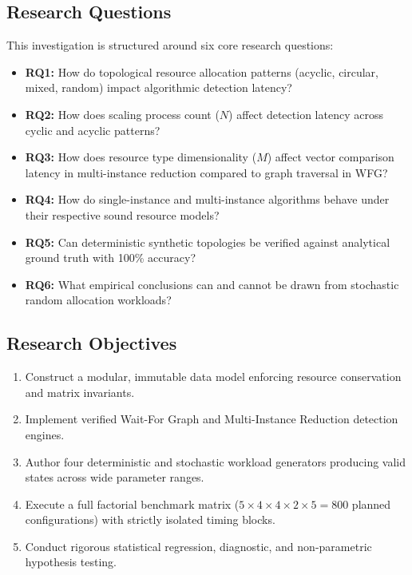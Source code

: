 \documentclass[11pt,a4paper]{article}
\begin{document}
\subsection{Research Questions}
This investigation is structured around six core research questions:
\begin{itemize}
    \item \textbf{RQ1:} How do topological resource allocation patterns (acyclic, circular, mixed, random) impact algorithmic detection latency?
    \item \textbf{RQ2:} How does scaling process count ($N$) affect detection latency across cyclic and acyclic patterns?
    \item \textbf{RQ3:} How does resource type dimensionality ($M$) affect vector comparison latency in multi-instance reduction compared to graph traversal in WFG?
    \item \textbf{RQ4:} How do single-instance and multi-instance algorithms behave under their respective sound resource models?
    \item \textbf{RQ5:} Can deterministic synthetic topologies be verified against analytical ground truth with 100\% accuracy?
    \item \textbf{RQ6:} What empirical conclusions can and cannot be drawn from stochastic random allocation workloads?
\end{itemize}

\subsection{Research Objectives}
\begin{enumerate}
    \item Construct a modular, immutable data model enforcing resource conservation and matrix invariants.
    \item Implement verified Wait-For Graph and Multi-Instance Reduction detection engines.
    \item Author four deterministic and stochastic workload generators producing valid states across wide parameter ranges.
    \item Execute a full factorial benchmark matrix ($5 \times 4 \times 4 \times 2 \times 5 = 800$ planned configurations) with strictly isolated timing blocks.
    \item Conduct rigorous statistical regression, diagnostic, and non-parametric hypothesis testing.
\end{enumerate}

\end{document}
